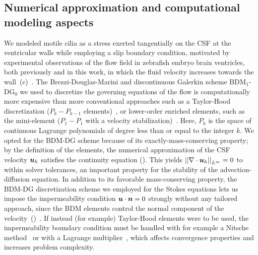 \documentclass{WileyMSP-template}
\begin{document}
\subsection{Numerical approximation and computational modeling aspects}
We modeled motile cilia as a stress
exerted tangentially on the CSF at the ventricular walls
while employing a slip boundary condition,
motivated by experimental observations of the
flow field in zebrafish embryo brain ventricles, both previously and in this work, in which
the fluid velocity increases towards the
wall~(c)~\cite{Olstad2019CiliaryDevelopment}. 
The Brezzi-Douglas-Marini and discontinuous Galerkin scheme
$\mathrm{BDM}_1$-$\mathrm{DG}_0$
we used to discretize the governing equations of the flow
is computationally more expensive
than more conventional approaches such as a
Taylor-Hood discretization
($P_k-P_{k-1}$ elements)~\cite{Stenberg1990ErrorProblem}, or lower-order enriched
elements, such as the mini-element
($P_1-P_1$ with a velocity stabilization)~\cite{Brezzi2011MixedMethods}.
Here, $P_k$ is the space of continuous Lagrange polynomials of degree less
than or equal to the integer $k$.
We opted for the BDM-DG scheme because of its exactly-mass-conserving property;
by the definition of the elements, the numerical approximation of
the CSF velocity $\bm{u}_h$ satisfies the continuity equation ().
This yields ${\vert\vert\nabla\cdot\bm{u}_h\vert\vert}_{L^{\infty}}=0$ to within solver tolerances,
an important property for the stability of the advection-diffusion
equation\cite{cesmelioglu2022compatible, johnson2009numerical, gresho1998incompressible}.
In addition to its favorable mass-conserving property,
the BDM-DG discretization scheme 
we employed for the Stokes equations
lets us impose the impermeability condition $\bm{u}\cdot\bm{n}=0$
strongly without any tailored approach,
since the BDM elements control the normal component of the 
velocity~()~\cite{Brezzi1985TwoProblems}.
If instead (for example) Taylor-Hood
elements were to be used, the impermeability boundary condition must
be handled with for example a Nitsche method~\cite{Nitsche1971UberSind}
or with a Lagrange multiplier~\cite{Babuska1973TheMultipliers,
Bertoluzza2017BoundaryHemodynamics}, which affects
convergence properties and increases problem complexity.
\end{document}
